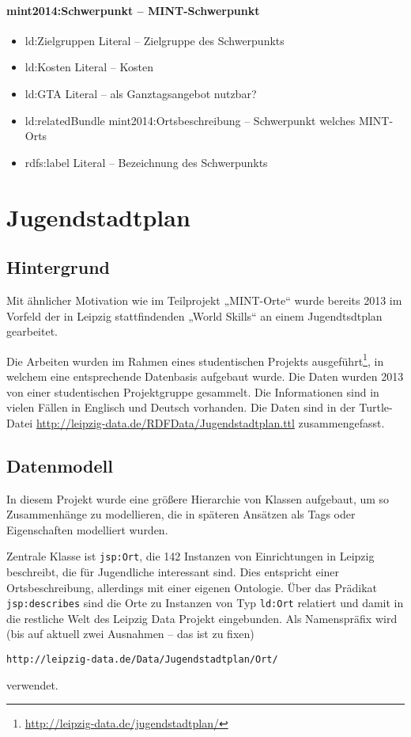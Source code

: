 \documentclass[a4paper,11pt]{article}
\begin{document}
\paragraph{mint2014:Schwerpunkt – MINT-Schwerpunkt}
\begin{itemize}\itemsep0pt
\item ld:Zielgruppen Literal – Zielgruppe des Schwerpunkts
\item ld:Kosten Literal – Kosten
\item ld:GTA Literal – als Ganztagsangebot nutzbar?
\item ld:relatedBundle mint2014:Ortsbeschreibung – Schwerpunkt welches
  MINT-Orts
\item rdfs:label Literal – Bezeichnung des Schwerpunkts
\end{itemize}

\section{Jugendstadtplan}

\subsection{Hintergrund}
Mit ähnlicher Motivation wie im Teilprojekt „MINT-Orte“ wurde bereits 2013 im
Vorfeld der in Leipzig stattfindenden „World Skills“ an einem Jugendtsdtplan
gearbeitet. 

Die Arbeiten wurden im Rahmen eines studentischen Projekts
ausgeführt\footnote{\url{http://leipzig-data.de/jugendstadtplan/}}, in welchem
eine entsprechende Datenbasis aufgebaut wurde. Die Daten wurden 2013 von einer
studentischen Projektgruppe gesammelt. Die Informationen sind in vielen Fällen
in Englisch und Deutsch vorhanden. Die Daten sind in der
Turtle-Datei \url{http://leipzig-data.de/RDFData/Jugendstadtplan.ttl}
zusammengefasst.

\subsection{Datenmodell}
In diesem Projekt wurde eine größere Hierarchie von Klassen aufgebaut, um so
Zusammenhänge zu modellieren, die in späteren Ansätzen als Tags oder
Eigenschaften modelliert wurden.

Zentrale Klasse ist \texttt{jsp:Ort}, die 142 Instanzen von Einrichtungen in
Leipzig beschreibt, die für Jugendliche interessant sind.  Dies entspricht
einer Ortsbeschreibung, allerdings mit einer eigenen Ontologie. Über das
Prädikat \texttt{jsp:describes} sind die Orte zu Instanzen von Typ
\texttt{ld:Ort} relatiert und damit in die restliche Welt des Leipzig Data
Projekt eingebunden.  Als Namenspräfix wird (bis auf aktuell zwei Ausnahmen --
das ist zu fixen) 
\begin{center}
  \texttt{http://leipzig-data.de/Data/Jugendstadtplan/Ort/}
\end{center}
verwendet.
\end{document}
